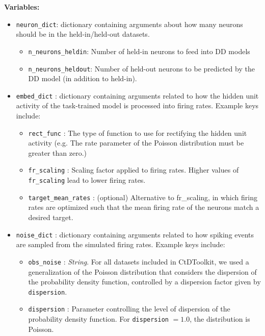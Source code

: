 \documentclass{article}
\begin{document}
\textbf{Variables:}
\begin{itemize}
    \item \texttt{neuron\_dict}: dictionary containing arguments about how many neurons should be in the held-in/held-out datasets.
    \begin{itemize}
        \item \texttt{n\_neurons\_heldin}: Number of held-in neurons to feed into DD models
        \item \texttt{n\_neurons\_heldout}: Number of held-out neurons to be predicted by the DD model (in addition to held-in).
    \end{itemize}
    \item \texttt{embed\_dict} : dictionary containing arguments related to how the hidden unit activity of the task-trained model is processed into firing rates. Example keys include:
    \begin{itemize}
        \item \texttt{rect\_func} : The type of function to use for rectifying the hidden unit activity (e.g. The rate parameter of the Poisson distribution must be greater than zero.)
        \item \texttt{fr\_scaling} : Scaling factor applied to firing rates. Higher values of \texttt{fr\_scaling} lead to lower firing rates.
        \item \texttt{target\_mean\_rates} : (optional) Alternative to fr\_scaling, in which firing rates are optimized such that the mean firing rate of the neurons match a desired target.
    \end{itemize}
    \item \texttt{noise\_dict} : dictionary containing arguments related to how spiking events are sampled from the simulated firing rates. Example keys include:
    \begin{itemize}
        \item \texttt{obs\_noise} : \emph{String}. For all datasets included in CtDToolkit, we used a generalization of the Poisson distribution that considers the dispersion of the probability density function, controlled by a dispersion factor given by \texttt{dispersion}.
        \item \texttt{dispersion} : Parameter controlling the level of dispersion of the probability density function. For \texttt{dispersion} $ = 1.0$, the distribution is Poisson.
    \end{itemize}
\end{itemize}
\end{document}
